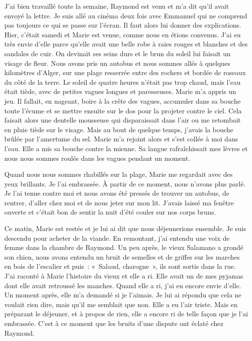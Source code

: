 \documentclass[french,twoside]{book} %
\newcommand\chaptercont{} %
\begin{document}
\chaptercont
\noindent J'ai bien travaillé toute la semaine, Raymond est venu et m’a dit qu’il avait envoyé la lettre. Je suis allé au cinéma deux fois avec Emmanuel qui ne comprend pas toujours ce qui se passe sur l’écran. Il faut alors lui donner des explications. Hier, c’était samedi et Marie est venue, comme nous en étions convenus. J'ai eu très envie d’elle parce qu’elle avait une belle robe à raies rouges et blanches et des sandales de cuir. On devinait ses seins durs et le brun du soleil lui faisait un visage de fleur. Nous avons pris un autobus et nous sommes allés à quelques kilomètres d’Alger, sur une plage resserrée entre des rochers et bordée de roseaux du côté de la terre. Le soleil de quatre heures n’était pas trop chaud, mais l’eau était tiède, avec de petites vagues longues et paresseuses. Marie m’a appris un jeu. Il fallait, en nageant, boire à la crête des vagues, accumuler dans sa bouche toute l’écume et se mettre ensuite sur le dos pour la projeter contre le ciel. Cela faisait alors une dentelle mousseuse qui disparaissait dans l’air ou me retombait en pluie tiède sur le visage. Mais au bout de quelque temps, j’avais la bouche brûlée par l’amertume du sel. Marie m’a rejoint alors et s’est collée à moi dans l’eau. Elle a mis sa bouche contre la mienne. Sa langue rafraîchissait mes lèvres et nous nous sommes roulés dans les vagues pendant un moment.\par
Quand nous nous sommes rhabillés sur la plage, Marie me regardait avec des yeux brillants. Je l’ai embrassée. À partir de ce moment, nous n’avons plus parlé. Je l’ai tenue contre moi et nous avons été pressés de trouver un autobus, de rentrer, d’aller chez moi et de nous jeter sur mon lit. J'avais laissé ma fenêtre ouverte et c’était bon de sentir la nuit d’été couler sur nos corps bruns.\par
Ce matin, Marie est restée et je lui ai dit que nous déjeunerions ensemble. Je suis descendu pour acheter de la viande. En remontant, j’ai entendu une voix de femme dans la chambre de Raymond. Un peu après, le vieux Salamano a grondé son chien, nous avons entendu un bruit de semelles et de griffes sur les marches en bois de l’escalier et puis : « Salaud, charogne », ils sont sortis dans la rue. J'ai raconté à Marie l’histoire du vieux et elle a ri. Elle avait un de mes pyjamas dont elle avait retroussé les manches. Quand elle a ri, j’ai eu encore envie d’elle. Un moment après, elle m’a demandé si je l’aimais. Je lui ai répondu que cela ne voulait rien dire, mais qu’il me semblait que non. Elle a eu l’air triste. Mais en préparant le déjeuner, et à propos de rien, elle a encore ri de telle façon que je l’ai embrassée. C'est à ce moment que les bruits d’une dispute ont éclaté chez Raymond.\par
\end{document}
